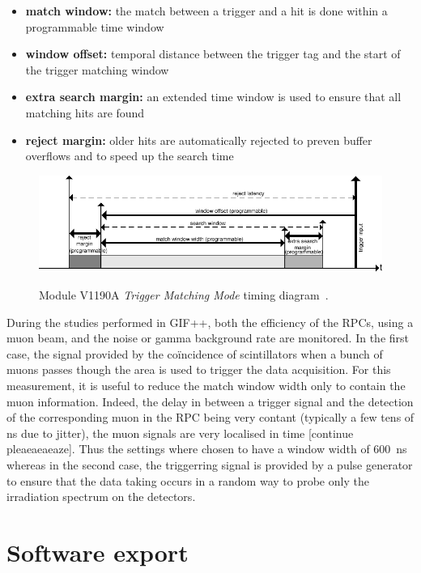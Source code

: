 	\begin{itemize}
		\item \textbf{match window:} the match between a trigger and a hit is done within a programmable time window
		\item \textbf{window offset:} temporal distance between the trigger tag and the start of the trigger matching window
		\item \textbf{extra search margin:} an extended time window is used to ensure that all matching hits are found
		\item \textbf{reject margin:} older hits are automatically rejected to preven buffer overflows and to speed up the search time
	\end{itemize}
    
    \begin{figure}[H]
		\centering
		\includegraphics[width = 1.25\plotwidth]{fig/app1/V1190A-TMM.pdf}\\
		\caption{\label{fig:V1190A-TMM} Module V1190A \textit{Trigger Matching Mode} timing diagram~\cite{V1190AMUT}.}
	\end{figure}
	
	During the studies performed in GIF++, both the efficiency of the RPCs, using a muon beam, and the noise or gamma background rate are monitored.
	In the first case, the signal provided by the coïncidence of scintillators when a bunch of muons passes though the area is used to trigger the data acquisition. For this measurement, it is useful to reduce the match window width only to contain the muon information. Indeed, the delay in between a trigger signal and the detection of the corresponding muon in the RPC being very contant (typically a few tens of ns due to jitter), the muon signals are very localised in time [continue pleaeaeaeaze]. Thus the settings where chosen to have a window width of \SI{600}{ns}  whereas in the second case, the triggerring signal is provided by a pulse generator to ensure that the data taking occurs in a random way to probe only the irradiation spectrum on the detectors.

\section{Software export}


\clearpage{\pagestyle{empty}\cleardoublepage}
